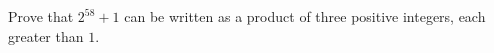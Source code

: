 Prove that $2^{58}+1$ can be written as a product of three positive integers, each greater than $1$.
